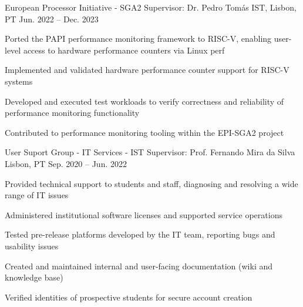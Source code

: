 
\begin{cventries}

  \cventry
    {European Processor Initiative - SGA2}
    {Supervisor: Dr. Pedro Tomás}
    {IST, Lisbon, PT}
    {Jun. 2022 -- Dec. 2023}
    {
      \begin{cvitems}
        \item Ported the PAPI performance monitoring framework to RISC-V, enabling user-level access to hardware performance counters via Linux perf
        \item Implemented and validated hardware performance counter support for RISC-V systems
        \item Developed and executed test workloads to verify correctness and reliability of performance monitoring functionality
        \item Contributed to performance monitoring tooling within the EPI-SGA2 project
      \end{cvitems}
    }

  \cventry
    {User Suport Group - IT Services - IST}
    {Supervisor: Prof. Fernando Mira da Silva}
    {Lisbon, PT}
    {Sep. 2020 -- Jun. 2022}
    {
      \begin{cvitems}
        \item Provided technical support to students and staff, diagnosing and resolving a wide range of IT issues
        \item Administered institutional software licenses and supported service operations
        \item Tested pre-release platforms developed by the IT team, reporting bugs and usability issues
        \item Created and maintained internal and user-facing documentation (wiki and knowledge base)
        \item Verified identities of prospective students for secure account creation
      \end{cvitems}
    }



\end{cventries}

